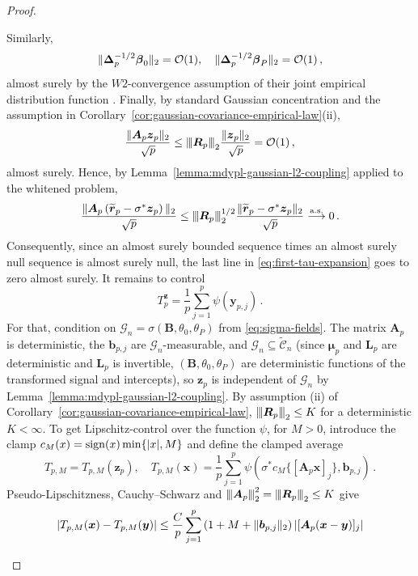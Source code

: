 \documentclass{article}
\makeatletter
\DeclareMathOperator{\sign}{sign}
\theoremstyle{definition}
\newcommand{\vnorm}[1]{%
	\ensuremath{%
		\if@display
		\left\| #1 \right\|
		\else
		\| #1 \|
		\fi
	}%
}
\newcommand{\abs}[1]{%
	\ensuremath{%
		\if@display
		\left| #1 \right|
		\else
		\lvert #1 \rvert
		\fi
	}%
}
\newcommand{\mnorm}[1]{{\left\vert\kern-0.25ex\left\vert\kern-0.25ex\left\vert #1
		\right\vert\kern-0.25ex\right\vert\kern-0.25ex\right\vert}}
\newcommand*{\bb}{\boldsymbol}
\def\bmu{\bb{\mu}}
\def\bbeta{\bb{\beta}}
\makeatother
\begin{document}
\begin{bibunit}
\begin{proof}
\begin{enumerate}[label=(\roman{*})]
Similarly, 
$$
     \vnorm{\bb \Delta_p^{-1/2} \bbeta_0}_2 = \mathcal{O}(1), \quad   \vnorm{\bb \Delta_p^{-1/2} \bbeta_P}_2 = \mathcal{O}(1) \,, 
$$
almost surely by the $W2$-convergence assumption of their joint empirical distribution function \citep[][Definition~6.8(iv) \& Theorem~6.9]{villani:2009}. Finally, by standard Gaussian concentration \citep[Theorem~3.1.1]{vershynin:2018} and the assumption in Corollary~\ref{cor:gaussian-covariance-empirical-law}(ii), 
$$
    \frac{\vnorm{\bb A_p \bb z_p}_2}{\sqrt{p}} \leq  \mnorm{\bb R_p}_2 \frac{\vnorm{\bb z_p}_2}{\sqrt p} = \mathcal{O}(1) \,, 
$$
almost surely. Hence, by Lemma~\ref{lemma:mdypl-gaussian-l2-coupling} applied to the whitened problem,
$$
    \frac{\vnorm{\bb A_p\left(\widetilde{\bb r}_p-\sigma^*\bb z_p\right)}_2}{\sqrt p}
    \leq
    \mnorm{\bb R_p}_2^{1/2}
    \frac{\vnorm{\widetilde{\bb r}_p-\sigma^*\bb z_p}_2}{\sqrt p}
    \overset{\mathrm{a.s.}}{\longrightarrow} 0\,.
$$
Consequently, since an almost surely bounded sequence times an almost surely null sequence is almost surely null, the last line in \eqref{eq:first-tau-expansion} goes to zero almost surely. 
It remains to control 
$$
    T_p^{\bb z}
    =
    \frac1p
    \sum_{j=1}^p
    \psi(\bb y_{p,j})\,.
$$
For that, condition on $\mathcal G_n=\sigma(\bb B,\theta_0,\theta_P)$ from \eqref{eq:sigma-fields}. The matrix $\bb A_p$ is deterministic, the $\bb b_{p,j}$ are
$\mathcal G_n$-measurable, and $\mathcal G_n\subseteq\widetilde{\mathcal C}_n$ (since $\bmu_p$ and $\bb L_p$ are deterministic and $\bb L_p$ is invertible, $(\bb B,\theta_0,\theta_P)$ are deterministic functions of the transformed signal and intercepts),
so $\bb z_p$ is independent of $\mathcal G_n$ by
Lemma~\ref{lemma:mdypl-gaussian-l2-coupling}. By
assumption (ii) of Corollary~\ref{cor:gaussian-covariance-empirical-law},
$\mnorm{\bb R_p}_2\leq K$ for a deterministic $K<\infty$.
To get Lipschitz-control over the function $\psi$, for 
$M>0$, introduce the clamp 
$c_M(x)=\sign(x)\min\{\abs{x},M\}$ and define the clamped average 
$$
    T_{p,M}
    =
    T_{p,M}(\bb z_p),
    \quad
    T_{p,M}(\bb x)
    =
    \frac1p
    \sum_{j=1}^p
    \psi
    \left(
        \sigma^* c_M\{[\bb A_p\bb x]_j\},
        \bb b_{p,j}
    \right)\,.
$$
Pseudo-Lipschitzness, Cauchy--Schwarz and
$\mnorm{\bb A_p}_2^2=\mnorm{\bb R_p}_2\leq K$ give
$$
\begin{aligned}
    \abs{T_{p,M}(\bb x)-T_{p,M}(\bb y)}
    &\leq
    \frac{C}{p}
    \sum_{j=1}^p
    \left(
        1+M+\vnorm{\bb b_{p,j}}_2
    \right)
    \abs{[\bb A_p(\bb x-\bb y)]_j}
    \\

\end{aligned}$$
\end{enumerate}
\end{proof}
\end{bibunit}
\end{document}
